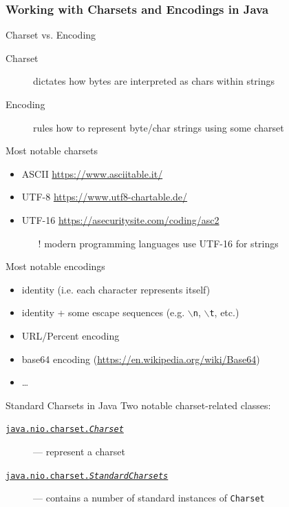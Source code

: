 \documentclass[presentation]{beamer}\mode<presentation>{\usetheme{AMSBolognaFC}}
\begin{document}
\begin{frame}[allowframebreaks]
    \frametitle{Working with Charsets and Encodings in Java}
    \begin{block}{Charset vs. Encoding}
        \begin{description}
            \item[Charset] dictates how bytes are interpreted as chars within strings
            \item[Encoding] rules how to represent byte/char strings using some charset
        \end{description}
    \end{block}

    \begin{examples}{Most notable charsets}
        \begin{itemize}
            \item ASCII \url{https://www.asciitable.it/}
            \item UTF-8 \url{https://www.utf8-chartable.de/}
            \item \alert{UTF-16} \url{https://asecuritysite.com/coding/asc2}
            \begin{itemize}
                \item[!] modern programming languages use UTF-16 for strings
            \end{itemize}
        \end{itemize}
    \end{examples}

    \begin{examples}{Most notable encodings}
        \begin{itemize}
            \item identity (i.e. each character represents itself)
            \item identity + some escape sequences (e.g. \texttt{$\backslash{}$n}, \texttt{$\backslash{}$t}, etc.)
            \item URL/Percent encoding
            \item base64 encoding (\url{https://en.wikipedia.org/wiki/Base64})
            \item \ldots
        \end{itemize}
    \end{examples}

    \begin{block}{Standard Charsets in Java}
        Two notable charset-related classes:
        \begin{description}
            \item[\href{\javadoc{java/nio/charset/Charset.html}}{\texttt{java.nio.charset.\textit{Charset}}}] --- represent a charset
            \item[\href{\javadoc{java/nio/charset/StandardCharsets.html}}{\texttt{java.nio.charset.\textit{StandardCharsets}}}] --- contains a number of standard instances of \texttt{Charset}
        \end{description}
    \end{block}


\end{frame}
\end{document}
